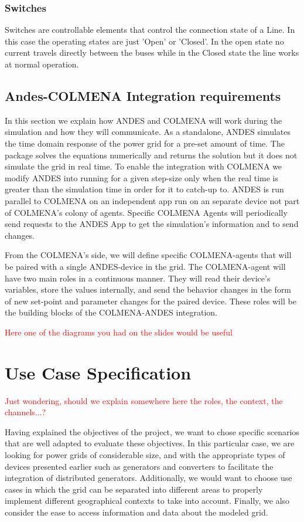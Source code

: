 \documentclass{article}
\begin{document}
\subsubsection*{Switches}
Switches are controllable elements that control the connection state of a Line. In this case the operating states are just 'Open' or 'Closed'. In the open state no current travels directly between the buses while in the Closed state the line works at normal operation. 

\subsection{Andes-COLMENA Integration requirements}

In this section we explain how ANDES and COLMENA will work during the simulation and how they will communicate. As a standalone, ANDES simulates the time domain response of the power grid for a pre-set amount of time. The package solves the equations numerically and returns the solution but it does not simulate the grid in real time. To enable the integration with COLMENA we modify ANDES into running for a given step-size only when the real time is greater than the simulation time in order for it to catch-up to. ANDES is run parallel to COLMENA on an independent app run on an separate device not part of COLMENA's colony of agents. Specific COLMENA Agents will periodically send requests to the ANDES App to get the simulation's information and to send changes.   

From the COLMENA's side, we will define specific COLMENA-agents that will be paired with a single ANDES-device in the grid. The COLMENA-agent will have two main roles in a continuous manner. They will read their device's variables, store the values internally, and send the behavior changes in the form of new set-point and parameter changes for the paired device. These roles will be the building blocks of the COLMENA-ANDES integration.      

\textcolor{red}{Here one of the diagrams you had on the slides would be useful}

\section{Use Case Specification}
\textcolor{red}{Just wondering, should we explain somewhere here the roles, the context, the channels...?}

Having explained the objectives of the project, we want to chose specific scenarios that are well adapted to evaluate these objectives. In this particular case, we are looking for power grids of considerable size, and with the appropriate types of devices presented earlier such as generators and converters to facilitate the integration of distributed generators. Additionally, we would want to choose use cases in which the grid can be separated into different areas to properly implement different geographical contexts to take into account. Finally, we also consider the ease to access information and data about the modeled grid.  
\end{document}
